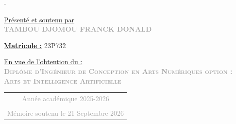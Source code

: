 \begin{titlingpage}
\begin{SingleSpace}
\begin{adjustwidth*}{\unitlength}{-\unitlength}
\begin{center}

{\normalsize \underline{ Présenté et soutenu par }} \\
\vspace{2mm}
{\large\textcolor{darkgray}{\textsc{\textbf{{ TAMBOU DJOMOU FRANCK DONALD }}}}\\
\vspace{6mm}}

{\normalsize \underline{\textbf{Matricule :}} 23P732} \\
\vspace{6mm}

{\normalsize \underline{En vue de l’obtention du :}}\\
\vspace{4mm}
{\large \textcolor{darkgray}{\textsc{\textbf{Diplôme d’Ingénieur de Conception en Arts Numériques option : Arts et
Intelligence Artificielle}}}}\\
\vspace{30mm}



\begin{tabular}{c}
{\large \textcolor{darkgray}{Année académique 2025-2026}}\\ \\
{\large \textcolor{darkgray}{Mémoire soutenu le 21 Septembre 2026}}
\end{tabular}

\end{center}

\end{adjustwidth*}

\end{SingleSpace}
\end{titlingpage}
